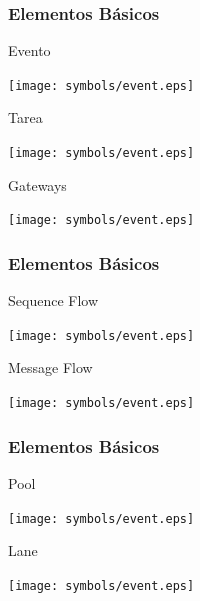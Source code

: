 \documentclass[a4paper,slidestop,xcolor=pst,blue]{beamer}
\begin{document}
\begin{frame}[c]
    \frametitle{Elementos Básicos}
    \begin{block}{Evento}
        \ \\
        \begin{center}
            \texttt{[image: symbols/event.eps]}
        \end{center}
    \end{block}
    \begin{block}{Tarea}
        \ \\
        \begin{center}
            \texttt{[image: symbols/event.eps]}
        \end{center}
    \end{block}
    \begin{block}{Gateways}
        \ \\
        \begin{center}
            \texttt{[image: symbols/event.eps]}
        \end{center}
    \end{block}
\end{frame}

\begin{frame}[c]
    \frametitle{Elementos Básicos}
    \begin{block}{Sequence Flow}
        \ \\
        \begin{center}
            \texttt{[image: symbols/event.eps]}
        \end{center}
    \end{block}
    \begin{block}{Message Flow}
        \ \\
        \begin{center}
            \texttt{[image: symbols/event.eps]}
        \end{center}
    \end{block}
\end{frame}

\begin{frame}[c]
    \frametitle{Elementos Básicos}
    \begin{block}{Pool}
        \ \\
        \begin{center}
            \texttt{[image: symbols/event.eps]}
        \end{center}
    \end{block}
    \begin{block}{Lane}
        \ \\
        \begin{center}
            \texttt{[image: symbols/event.eps]}
        \end{center}
    \end{block}
\end{frame}
\end{document}
